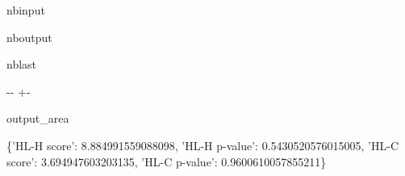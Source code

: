 \documentclass[letterpaper,10pt,english]{sphinxmanual}
\begin{document}
\begin{sphinxuseclass}{nbinput}
{
\begin{sphinxVerbatim}[commandchars=\\\{\}]
\llap{\color{nbsphinxin}[3]:\,\hspace{\fboxrule}\hspace{\fboxsep}}
   
  
  \PYG{p}{[} \PYG{p}{]}
\end{sphinxVerbatim}
}

\end{sphinxuseclass}
\begin{sphinxuseclass}{nboutput}
\begin{sphinxuseclass}{nblast}
{

\kern-\sphinxverbatimsmallskipamount\kern-\baselineskip
\kern+\FrameHeightAdjust\kern-\fboxrule
\vspace{\nbsphinxcodecellspacing}

\begin{sphinxuseclass}{output_area}
\begin{sphinxuseclass}{}


\begin{sphinxVerbatim}[commandchars=\\\{\}]
\llap{\color{nbsphinxout}[3]:\,\hspace{\fboxrule}\hspace{\fboxsep}}\{'HL-H score': 8.884991559088098,
 'HL-H p-value': 0.5430520576015005,
 'HL-C score': 3.694947603203135,
 'HL-C p-value': 0.9600610057855211\}
\end{sphinxVerbatim}



\end{sphinxuseclass}
\end{sphinxuseclass}
}

\end{sphinxuseclass}
\end{sphinxuseclass}
\end{document}
